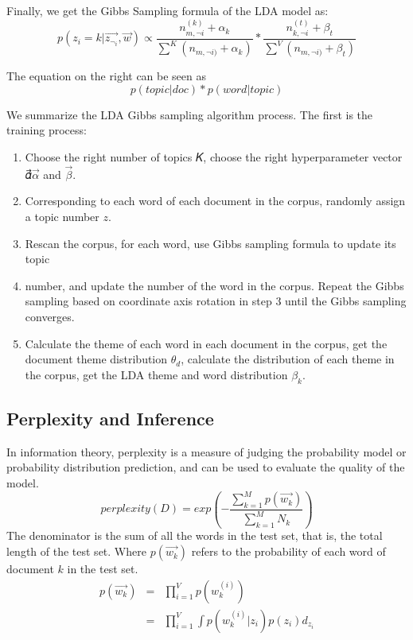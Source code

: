 Finally, we get the Gibbs Sampling formula of the LDA model as:
\[
p(z_i=k|\vec{z_{\neg_i}},\vec{w}) \propto \frac{n_{m,\neg{i}}^{(k)}+\alpha_k}{\sum^K (n_{m,\neg{i})}+\alpha_k)} *
 \frac{n_{k,\neg{i}}^{(t)}+\beta_t}{\sum^V (n_{m,\neg{i})}+\beta_t)}
\]


The equation on the right can be seen as \[
  p(topic|doc)*p(word|topic)
\]


We summarize the LDA Gibbs sampling algorithm process. The first is the training process:
\begin{enumerate}
  \item  Choose the right number of topics 𝐾, choose the right hyperparameter vector 𝛼⃗$\vec{\alpha}$ and $\vec{\beta}$.
　\item Corresponding to each word of each document in the corpus, randomly assign a topic number $z$.
　\item Rescan the corpus, for each word, use Gibbs sampling formula to update its   topic
  \item number, and update the number of the word in the corpus.
Repeat the Gibbs sampling based on coordinate axis rotation in step 3 until the Gibbs sampling converges.
  \item Calculate the theme of each word in each document in the corpus, get the document theme distribution $\theta_d$, calculate the distribution of each theme in the corpus, get the LDA theme and word distribution $\beta_k$.
\end{enumerate}

\subsection{Perplexity and Inference}

In information theory, perplexity is a measure of judging the probability model or probability distribution prediction, and can be used to evaluate the quality of the model.
\[
  perplexity(D) = exp(-\frac{\sum_{k=1}^{M}p(\vec{w_k})}{\sum_{k=1}^{M}N_k})
\]
The denominator is the sum of all the words in the test set, that is, the total length of the test set. Where $p(\vec{w_k})$ refers to the probability of each word of document $k$ in the test set.
\begin{eqnarray*}
  p(\vec{w_k}) &=&\prod_{i=1}^{V}p(w_k^{(i)})\\
               &=&\prod_{i=1}^{V}\int p(w_k^{(i)}|z_i)p(z_i)d_{z_i}
\end{eqnarray*}

